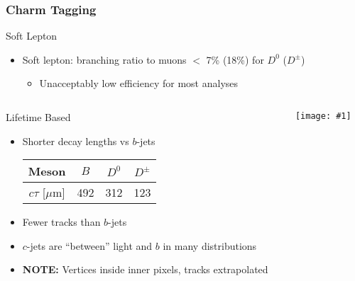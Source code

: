 \documentclass[usenames,dvipsnames]{beamer}
\newcommand{\widegraphic}[1]{\texttt{[image: \#1]}}
\begin{document}
\begin{frame}
  \frametitle{Charm Tagging}
  \begin{block}{Soft Lepton}
  \begin{itemize}
  \item Soft lepton: branching ratio to muons $<$ 7\% (18\%) for $D^0$ ($D^\pm$)
    \begin{itemize}
    \item Unacceptably low efficiency for most analyses
    \end{itemize}
  \end{itemize}
  \end{block}
  \begin{columns}
    \begin{column}{0.5\textwidth}
      \begin{block}{Lifetime Based}
      \begin{itemize}
      \item Shorter decay lengths vs $b$-jets
        \begin{center}
          \begin{tabular}{c | c c c}
            Meson  &  $B$ & $D^0$ & $D^{\pm}$ \\ \hline
            $c\tau$ [$\mu$m] & 492 & 312 & 123 \\
          \end{tabular}
        \end{center}
      \item Fewer tracks than $b$-jets
      \item $c$-jets are ``between'' light and $b$ in many distributions
      \item \textbf{NOTE:} Vertices inside inner pixels, tracks extrapolated
      \end{itemize}
      \end{block}
    \end{column}
    \begin{column}{0.5\textwidth}
      \widegraphic{figures/external/b-jet.pdf}
    \end{column}
  \end{columns}
\end{frame}
\end{document}
